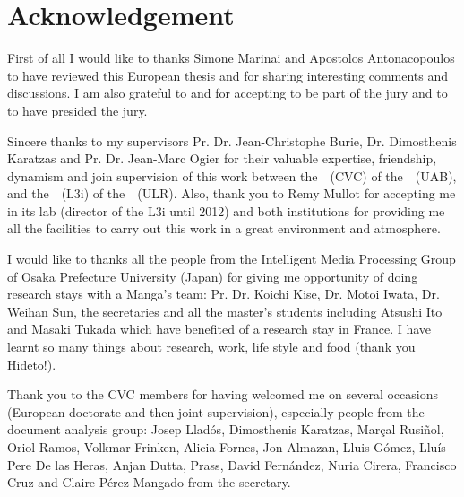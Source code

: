 \chapter*{Acknowledgement}

First of all I would like to thanks Simone Marinai and Apostolos Antonacopoulos to have reviewed this European thesis and for sharing interesting comments and discussions.
I am also grateful to  and  for accepting to be part of the jury and to  to have presided the jury.

Sincere thanks to my supervisors Pr. Dr. Jean-Christophe Burie, Dr. Dimosthenis Karatzas and Pr. Dr. Jean-Marc Ogier for their valuable expertise, friendship, dynamism and join supervision of this work between the~\CVC~(CVC) of the~\UAB~(UAB), and the~\LIII~(L3i) of the~\ULR~(ULR).
Also, thank you to Remy Mullot for accepting me in its lab (director of the L3i until 2012) and both institutions for providing me all the facilities to carry out this work in a great environment and atmosphere.

I would like to thanks all the people from the Intelligent Media Processing Group of Osaka Prefecture University (Japan) for giving me opportunity of doing research stays with a Manga's team: Pr. Dr. Koichi Kise, Dr. Motoi Iwata, Dr. Weihan Sun, the secretaries and all the master's students including Atsushi Ito and Masaki Tukada which have benefited of a research stay in France.
I have learnt so many things about research, work, life style and food (thank you Hideto!).

Thank you to the CVC members for having welcomed me on several occasions (European doctorate and then joint supervision), especially people from the document analysis group: Josep Llad\'{o}s, Dimosthenis Karatzas, Marçal Rusiñol, Oriol Ramos, Volkmar Frinken, Alicia Fornes, Jon Almazan, Lluis G\'{o}mez, Llu\'{i}s Pere De las Heras, Anjan Dutta, Prass, David Fern\'{a}ndez, Nuria Cirera, Francisco Cruz and Claire Pérez-Mangado from the secretary.
\\

